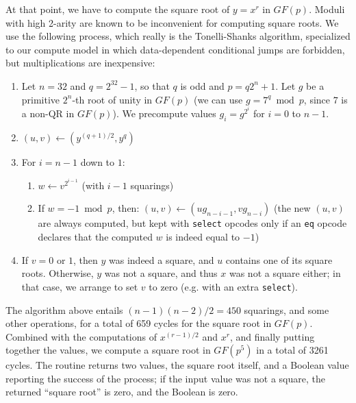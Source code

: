 \documentclass{llncs}
\newcommand{\GF}{GF}
\begin{document}
At that point, we have to compute the square root of $y = x^r$ in
$\GF(p)$. Moduli with high 2-arity are known to be inconvenient for
computing square roots. We use the following process, which really is
the Tonelli-Shanks algorithm, specialized to our compute model in which
data-dependent conditional jumps are forbidden, but multiplications are
inexpensive:
\begin{enumerate}

    \item Let $n = 32$ and $q = 2^{32} - 1$, so that $q$ is odd and
    $p = q 2^n + 1$. Let $g$ be a primitive $2^n$-th root of unity in
    $\GF(p)$ (we can use $g = 7^q \bmod p$, since $7$ is a non-QR in
    $\GF(p)$). We precompute values $g_i = g^{2^i}$ for $i = 0$ to
    $n-1$.

    \item $(u, v) \leftarrow (y^{(q+1)/2}, y^q)$

    \item For $i = n-1$ down to $1$:
        \begin{enumerate}
            \item $w \leftarrow v^{2^{i-1}}$ (with $i-1$ squarings)
            \item If $w = -1 \bmod p$, then:
            $(u, v) \leftarrow (u g_{n-i-1}, v g_{n-i})$ (the new
            $(u, v)$ are always computed, but kept with \verb+select+
            opcodes only if an \verb+eq+ opcode declares that the computed
            $w$ is indeed equal to $-1$)
        \end{enumerate}

    \item If $v = 0$ or $1$, then $y$ was indeed a square, and $u$ contains
    one of its square roots. Otherwise, $y$ was not a square, and thus
    $x$ was not a square either; in that case, we arrange to set $v$ to
    zero (e.g. with an extra \verb+select+).

\end{enumerate}
The algorithm above entails $(n-1)(n-2)/2 = 450$ squarings, and some other
operations, for a total of 659 cycles for the square root in $\GF(p)$.
Combined with the computations of $x^{(r-1)/2}$ and $x^r$, and finally
putting together the values, we compute a square root in $\GF(p^5)$
in a total of 3261 cycles. The routine returns two values, the square
root itself, and a Boolean value reporting the success of the process;
if the input value was not a square, the returned ``square root'' is zero,
and the Boolean is zero.
\end{document}
